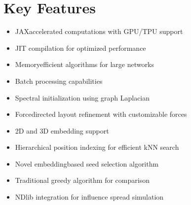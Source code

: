 \documentclass[letterpaper,10pt,english]{sphinxmanual}
\begin{document}
\section{Key Features}
\label{\detokenize{index:key-features}}\begin{description}
\begin{itemize}
\item {} 
\sphinxAtStartPar
JAX\sphinxhyphen{}accelerated computations with GPU/TPU support

\item {} 
\sphinxAtStartPar
JIT compilation for optimized performance

\item {} 
\sphinxAtStartPar
Memory\sphinxhyphen{}efficient algorithms for large networks

\item {} 
\sphinxAtStartPar
Batch processing capabilities

\end{itemize}

\begin{itemize}
\item {} 
\sphinxAtStartPar
Spectral initialization using graph Laplacian

\item {} 
\sphinxAtStartPar
Force\sphinxhyphen{}directed layout refinement with customizable forces

\item {} 
\sphinxAtStartPar
2D and 3D embedding support

\item {} 
\sphinxAtStartPar
Hierarchical position indexing for efficient k\sphinxhyphen{}NN search

\end{itemize}

\begin{itemize}
\item {} 
\sphinxAtStartPar
Novel embedding\sphinxhyphen{}based seed selection algorithm

\item {} 
\sphinxAtStartPar
Traditional greedy algorithm for comparison

\item {} 
\sphinxAtStartPar
NDlib integration for influence spread simulation


\end{itemize}
\end{description}
\end{document}
